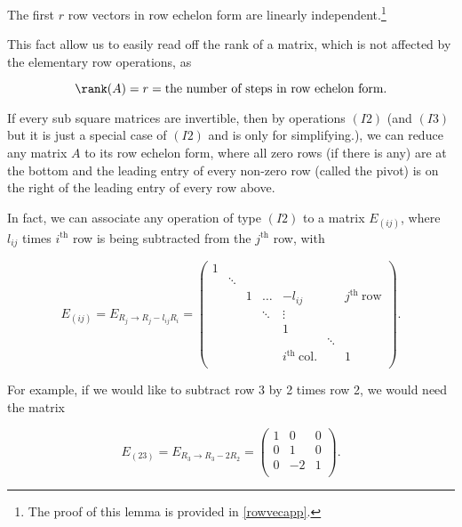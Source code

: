\documentclass[a4paper,12pt]{report}
\begin{document}
\begin{lemma} \label{rowvec} 
    The first \(r\) row vectors in row echelon form are linearly independent.\footnote{The proof of this lemma is provided in \cref{rowvecapp}.}
    \end{lemma}
    
This fact allow us to easily read off the rank of a matrix, which is not affected by the elementary row operations, as

\begin{equation}
    \rank (A) = r = \text{the number of steps in row echelon form.}
\end{equation}

If every sub square matrices are invertible, then by operations \((I2)\) (and \((I3)\) but it is just a special case of \((I2)\) and is only for simplifying.), we can reduce any matrix \(A\) to its row echelon form,  where all zero rows (if there is any) are at the bottom and the leading entry of every non-zero row (called the pivot) is on the right of the leading entry of every row above. 

In fact, we can associate any operation of type \((I2)\) to a matrix \(E_{(ij)} \), where \(l_{ij} \) times \(i^{\text{th}} \) row is being subtracted from the \(j^{\text{th}} \) row, with 

\begin{equation}
    E_{(ij)} = E_{R_{j} \rightarrow R_{j}-l_{ij}  R_{i}   } = \begin{pmatrix}
        1 &  &  &  &  &  &   \\
         & \ddots  &  &  &  &  &   \\
         &  & 1 & \ldots  & -l_{ij}  &  & j^{\text{th }}\text{row}   \\
         &  &  & \ddots  & \vdots  &  &   \\
         &  &  &  & 1 &  &   \\
         &  &  &  &  & \ddots  &   \\
         &  &  &  & i^{\text{th }}\text{col.}  &  & 1  \\
    \end{pmatrix}.
\end{equation}

For example, if we would like to subtract row 3 by 2 times row 2, we would need the matrix 

\begin{equation}
    E_{(23)} = E_{R_{3} \to R_{3} - 2R_{2}   } = \begin{pmatrix}
        1 & 0 &  0 \\
        0 & 1 &  0 \\
        0 & -2 & 1  \\
    \end{pmatrix}.
\end{equation}
\end{document}
